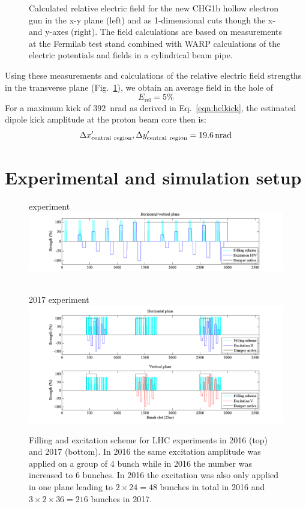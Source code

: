 \documentclass[%
 reprint,
 amsmath,amssymb,
 aps,
prstab,
]{revtex4-1}
\begin{document}
\begin{figure}[h]
\begin{minipage}[t]{0.49\linewidth}
	\end{minipage}
	\caption{Calculated relative electric field for the new CHG1b hollow electron gun in the x-y plane (left) and as 1-dimensional cuts though the x- and y-axes (right). The field calculations are based on measurements at the Fermilab test stand combined with WARP  calculations of the electric potentials and fields in a cylindrical beam pipe.}
	\label{core:fig:1}
\end{figure}

Using these measurements and calculations of the relative electric field strengths in the transverse plane (Fig.~\ref{core:fig:1}), we obtain an average field in the hole of
\begin{equation}
	E_{\mathrm{rel}}= 5\%
\end{equation}
For a maximum kick of $392$~nrad as derived in Eq.~\ref{eqn:helkick}, the estimated dipole kick amplitude at the proton beam core then is:
\begin{equation}\label{eqn:kick_central}
\Delta x'_{\rm{central \ region}}, \Delta y'_{\rm{central \ region}} = \SI{19.6}{nrad}
\end{equation}

\section{Experimental and simulation setup\label{sec:exp}}
\begin{figure}
	\begin{minipage}[t]{1.0\linewidth}
		 experiment\\
		\includegraphics[width=0.7\linewidth]{bunchfilling_2016.png}	
	\end{minipage}
	\begin{minipage}[t]{1.0\linewidth}
		\centering
		$ $\\
		2017 experiment\\
		\includegraphics[width=0.7\linewidth]{bunchfilling_2017.png}	
	\end{minipage}
	\caption{\label{fig:fill} Filling and excitation scheme for LHC experiments in 2016 (top) and 2017 (bottom). In 2016 the same excitation amplitude was applied on a group of 4 bunch while in 2016 the number was increased to 6 bunches. In 2016 the excitation was also only applied in one plane leading to $2\times24=48$ bunches in total in 2016 and $3\times2\times36=216$ bunches in 2017.}
\end{figure}
\end{document}
